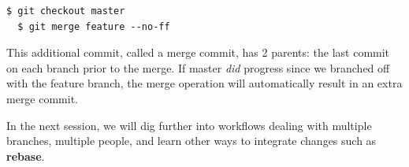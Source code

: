 \documentclass{../../common/tufte-latex/tufte-handout}
\begin{document}
\begin{lstlisting}[style=BashInputStyle]
  $ git checkout master
  $ git merge feature --no-ff
\end{lstlisting}

This additional commit, called a merge commit, has 2 parents: the last commit on each branch prior to the merge.
If master \textit{did} progress since we branched off with the feature branch, the merge operation will automatically result in an extra merge commit.

In the next session, we will dig further into workflows dealing with multiple branches, multiple people, and learn other ways to integrate changes such as \textbf{rebase}.



\end{document}
